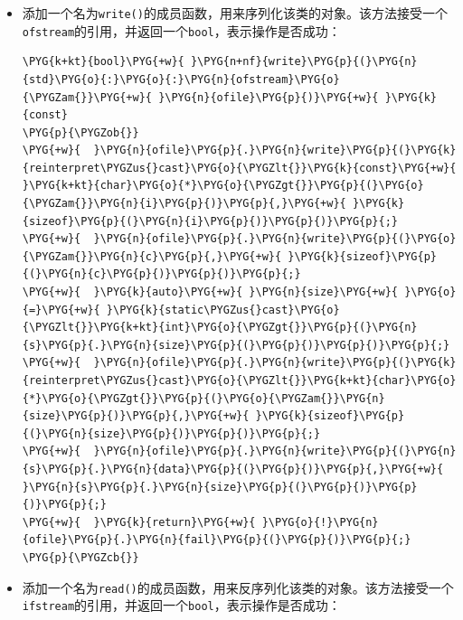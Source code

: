 \begin{itemize}
\item 添加一个名为\texttt{write()}的成员函数，用来序列化该类的对象。该方法接受一个\texttt{ofstream}的引用，并返回一个\texttt{bool}，表示操作是否成功：



\begin{codeblockbg}
\begin{Verbatim}[commandchars=\\\{\},breaklines=true,breakanywhere=true,fontsize=\codefont,xleftmargin=17bp]
\PYG{k+kt}{bool}\PYG{+w}{ }\PYG{n+nf}{write}\PYG{p}{(}\PYG{n}{std}\PYG{o}{:}\PYG{o}{:}\PYG{n}{ofstream}\PYG{o}{\PYGZam{}}\PYG{+w}{ }\PYG{n}{ofile}\PYG{p}{)}\PYG{+w}{ }\PYG{k}{const}
\PYG{p}{\PYGZob{}}
\PYG{+w}{  }\PYG{n}{ofile}\PYG{p}{.}\PYG{n}{write}\PYG{p}{(}\PYG{k}{reinterpret\PYGZus{}cast}\PYG{o}{\PYGZlt{}}\PYG{k}{const}\PYG{+w}{ }\PYG{k+kt}{char}\PYG{o}{*}\PYG{o}{\PYGZgt{}}\PYG{p}{(}\PYG{o}{\PYGZam{}}\PYG{n}{i}\PYG{p}{)}\PYG{p}{,}\PYG{+w}{ }\PYG{k}{sizeof}\PYG{p}{(}\PYG{n}{i}\PYG{p}{)}\PYG{p}{)}\PYG{p}{;}
\PYG{+w}{  }\PYG{n}{ofile}\PYG{p}{.}\PYG{n}{write}\PYG{p}{(}\PYG{o}{\PYGZam{}}\PYG{n}{c}\PYG{p}{,}\PYG{+w}{ }\PYG{k}{sizeof}\PYG{p}{(}\PYG{n}{c}\PYG{p}{)}\PYG{p}{)}\PYG{p}{;}
\PYG{+w}{  }\PYG{k}{auto}\PYG{+w}{ }\PYG{n}{size}\PYG{+w}{ }\PYG{o}{=}\PYG{+w}{ }\PYG{k}{static\PYGZus{}cast}\PYG{o}{\PYGZlt{}}\PYG{k+kt}{int}\PYG{o}{\PYGZgt{}}\PYG{p}{(}\PYG{n}{s}\PYG{p}{.}\PYG{n}{size}\PYG{p}{(}\PYG{p}{)}\PYG{p}{)}\PYG{p}{;}
\PYG{+w}{  }\PYG{n}{ofile}\PYG{p}{.}\PYG{n}{write}\PYG{p}{(}\PYG{k}{reinterpret\PYGZus{}cast}\PYG{o}{\PYGZlt{}}\PYG{k+kt}{char}\PYG{o}{*}\PYG{o}{\PYGZgt{}}\PYG{p}{(}\PYG{o}{\PYGZam{}}\PYG{n}{size}\PYG{p}{)}\PYG{p}{,}\PYG{+w}{ }\PYG{k}{sizeof}\PYG{p}{(}\PYG{n}{size}\PYG{p}{)}\PYG{p}{)}\PYG{p}{;}
\PYG{+w}{  }\PYG{n}{ofile}\PYG{p}{.}\PYG{n}{write}\PYG{p}{(}\PYG{n}{s}\PYG{p}{.}\PYG{n}{data}\PYG{p}{(}\PYG{p}{)}\PYG{p}{,}\PYG{+w}{ }\PYG{n}{s}\PYG{p}{.}\PYG{n}{size}\PYG{p}{(}\PYG{p}{)}\PYG{p}{)}\PYG{p}{;}
\PYG{+w}{  }\PYG{k}{return}\PYG{+w}{ }\PYG{o}{!}\PYG{n}{ofile}\PYG{p}{.}\PYG{n}{fail}\PYG{p}{(}\PYG{p}{)}\PYG{p}{;}
\PYG{p}{\PYGZcb{}}
\end{Verbatim}
\end{codeblockbg}



\item 添加一个名为\texttt{read()}的成员函数，用来反序列化该类的对象。该方法接受一个\texttt{ifstream}的引用，并返回一个\texttt{bool}，表示操作是否成功：



\end{itemize}
